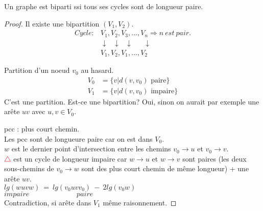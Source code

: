 \begin{mytheo} 
  Un graphe est biparti ssi tous ses cycles sont de longueur paire.
  \begin{proof}
    \noindent
    \newline
    \fbox{$\Longrightarrow$}
    \newline
    Il existe une bipartition $(V_1,V_2)$.\\
    \begin{align*}
      Cycle : & V_1, V_2, V_3, ..., V_n \Rightarrow n\ est\ pair.\\
              & \downarrow\ \ \ \downarrow\ \ \ \downarrow\ \ \ \ \ \ \ \downarrow\\
              & V_1, V_2, V_1, ..., V_2
    \end{align*}

    \noindent
    \fbox{$\Longleftarrow$}
    \newline
    Partition d'un noeud $v_0$ au hasard.
    \begin{align*}
      V_0 & = \{v|d(v, v_0)\text{ paire}\}\\
      V_1 & = \{v|d(v, v_0)\text{ impaire}\}
    \end{align*}
    C'est une partition. Est-ce une bipartition?
    Oui, sinon on aurait par exemple une arête $uv$ avec $u, v \in V_0$.

    \begin{center}
    \end{center}
    pcc : plus court chemin.\\
    Les pcc sont de longueure paire car on est dans $V_0$.\\
    $w$ est le dernier point d'intersection entre les chemins $v_0 \to u$ et $v_0 \to v$.\\
    \textcolor{red}{$\triangle$} est un cycle de longueur impaire car $w \to u$ et $w \to v$ sont paires (les deux sous-chemins de $v_0 \to w$ sont des plus court chemin de même longueur) + une arête $uv$.\\
    $lg(wuvw)\ =\ lg(v_{0}uvv_0)\ - \ 2lg(v_0w)$\\
    $impaire\ \ \ \ \ \ \ \ \ \ \ \ \ \ \ \ \ \ \ \ \ \ \ \ \ \ \ \ \ \ paire$\\
    Contradiction, si arête dans $V_1$ même raisonnement.
  \end{proof}
\end{mytheo}
